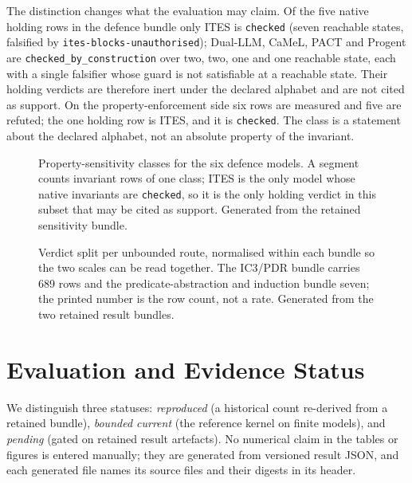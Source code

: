 \documentclass[11pt]{article}
\begin{document}
The distinction changes what the evaluation may claim. Of the five native
holding rows in the defence bundle only ITES is \texttt{checked} (seven
reachable states, falsified by \texttt{ites-blocks-unauthorised}); Dual-LLM,
CaMeL, PACT and Progent are \texttt{checked\_by\_construction} over two, two,
one and one reachable state, each with a single falsifier whose guard is not
satisfiable at a reachable state. Their holding verdicts are therefore inert
under the declared alphabet and are not cited as support. On the
property-enforcement side six rows are measured and five are refuted; the one
holding row is ITES, and it is \texttt{checked}. The class is a statement
about the declared alphabet, not an absolute property of the invariant.

\begin{figure}[t]
\centering

\caption{Property-sensitivity classes for the six defence models. A segment
counts invariant rows of one class; ITES is the only model whose native
invariants are \texttt{checked}, so it is the only holding verdict in this
subset that may be cited as support. Generated from the retained sensitivity
bundle.}
\label{fig:property-sensitivity}
\end{figure}

\begin{figure}[t]
\centering

\caption{Verdict split per unbounded route, normalised within each bundle so
the two scales can be read together. The IC3/PDR bundle carries 689 rows and
the predicate-abstraction and induction bundle seven; the printed number is
the row count, not a rate. Generated from the two retained result bundles.}
\label{fig:unbounded-routes}
\end{figure}


\section{Evaluation and Evidence Status}
\label{sec:eval}

We distinguish three statuses: \emph{reproduced} (a historical
count re-derived from a retained bundle), \emph{bounded current} (the
reference kernel on finite models), and \emph{pending} (gated on retained
result artefacts). No numerical claim in the tables or figures is entered
manually; they are generated from versioned result JSON, and each generated
file names its source files and their digests in its header.
\end{document}
